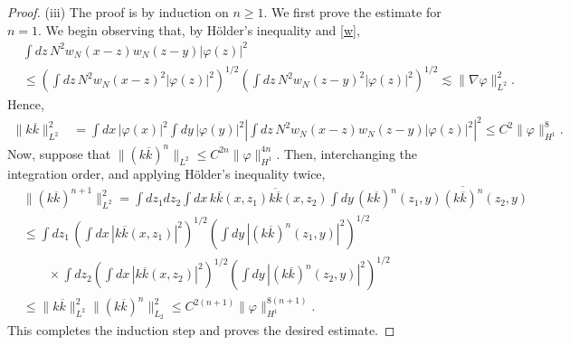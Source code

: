 \documentclass[a4paper,11pt]{article}
\begin{document}
\begin{proof}
  (iii) The proof is by induction on $n \ge 1$. We first prove the estimate
  for $n=1$. We begin observing that, by H\"older's inequality and \eqref{w},
  \begin{equation}
    \begin{aligned}
      & \int dz \, N^2 w_N(x-z) w_N(z-y) |\varphi(z)|^2 \\
      & \le \left( \int dz \, N^2 w_N(x-z)^2 |\varphi(z)|^2 \right)^{1/2} \left(
      \int dz \, N^2 w_N(z-y)^2 |\varphi(z)|^2 \right)^{1/2} \apprle \| \nabla
      \varphi \|_{L^2}^2.
    \end{aligned}
    \label{ww}
  \end{equation}
  Hence,
  \begin{align*}
    \| k \overline{k} \|_{L^2}^2 & = \int dx \, |\varphi(x)|^2 \int dy \,
    |\varphi(y)|^2 \left| \int dz \, N^2 w_N(x-z) w_N(z-y) |\varphi(z)|^2
    \right|^2 \le C^2 \| \varphi \|_{H^1}^8.
  \end{align*}
  Now, suppose that $\| (k \overline{k})^n \|_{L^2} \le C^{2n} \| \varphi
  \|_{H^1}^{4n}$. Then, interchanging the integration order, and applying
  H\"older's inequality twice,
  \begin{align*}
    & \| (k \overline{k})^{n+1} \|_{L^2}^2 = \int dz_1 dz_2 \int dx \,
    k\overline{k}(x,z_1) \overline{ k \overline{k}}(x,z_2) \int dy \,
    (k\overline{k})^n(z_1,y) \overline{ (k \overline{k})^n}(z_2,y) \\
    & \le \int dz_1 \, \left( \int dx \, | k\overline{k}(x,z_1)|^2
    \right)^{1/2} \left( \int dy \, | (k\overline{k})^n(z_1,y)|^2
    \right)^{1/2} \\
    & \qquad \times \int dz_2 \left( \int dx \, | k\overline{k}(x,z_2)|^2
    \right)^{1/2} \left( \int dy \, | (k\overline{k})^n(z_2,y)|^2
    \right)^{1/2} \\
    & \le \| k \overline{k} \|_{L^2}^2 \| (k \overline{k})^n \|_{L_2}^2 \le
    C^{2(n+1)} \| \varphi \|_{H^1}^{8(n+1)}.
  \end{align*}
  This completes the induction step and proves the desired estimate.



\end{proof}
\end{document}
